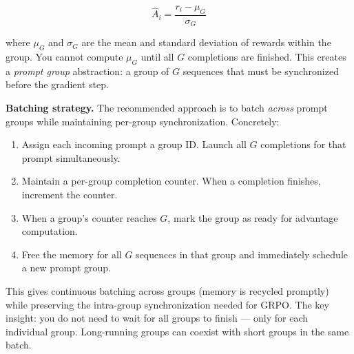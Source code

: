 $$\hat{A}_i = \frac{r_i - \mu_G}{\sigma_G}$$

where $\mu_G$ and $\sigma_G$ are the mean and standard deviation of rewards within the group. You cannot compute $\mu_G$ until all $G$ completions are finished. This creates a \textit{prompt group} abstraction: a group of $G$ sequences that must be synchronized before the gradient step.

\textbf{Batching strategy.} The recommended approach is to batch \textit{across} prompt groups while maintaining per-group synchronization. Concretely:
\begin{enumerate}
  \item Assign each incoming prompt a group ID. Launch all $G$ completions for that prompt simultaneously.
  \item Maintain a per-group completion counter. When a completion finishes, increment the counter.
  \item When a group's counter reaches $G$, mark the group as ready for advantage computation.
  \item Free the memory for all $G$ sequences in that group and immediately schedule a new prompt group.
\end{enumerate}

This gives continuous batching across groups (memory is recycled promptly) while preserving the intra-group synchronization needed for GRPO. The key insight: you do not need to wait for all groups to finish --- only for each individual group. Long-running groups can coexist with short groups in the same batch.

